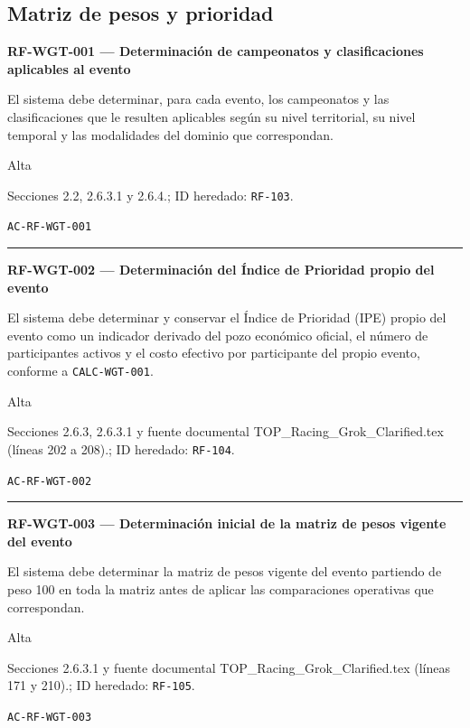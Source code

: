 \documentclass[10pt,letterpaper]{article}
\begin{document}
\subsection{Matriz de pesos y prioridad}
\noindent\textbf{RF-WGT-001 --- Determinación de campeonatos y clasificaciones aplicables al evento}\par
\begin{description}[style=nextline,leftmargin=3.15cm,labelwidth=2.8cm,font=\normalfont\bfseries]
\item[Obligación] El sistema debe determinar, para cada evento, los campeonatos y las clasificaciones que le resulten aplicables según su nivel territorial, su nivel temporal y las modalidades del dominio que correspondan.
\item[Prioridad] Alta
\item[Procedencia] Secciones 2.2, 2.6.3.1 y 2.6.4.; ID heredado: \texttt{RF-103}.
\item[Verificación] \texttt{AC-RF-WGT-001}
\end{description}
\vspace{0.25em}\hrule\vspace{0.65em}
\noindent\textbf{RF-WGT-002 --- Determinación del Índice de Prioridad propio del evento}\par
\begin{description}[style=nextline,leftmargin=3.15cm,labelwidth=2.8cm,font=\normalfont\bfseries]
\item[Obligación] El sistema debe determinar y conservar el Índice de Prioridad (IPE) propio del evento como un indicador derivado del pozo económico oficial, el número de participantes activos y el costo efectivo por participante del propio evento, conforme a \texttt{CALC-WGT-001}.
\item[Prioridad] Alta
\item[Procedencia] Secciones 2.6.3, 2.6.3.1 y fuente documental TOP\_Racing\_Grok\_Clarified.tex (líneas 202 a 208).; ID heredado: \texttt{RF-104}.
\item[Verificación] \texttt{AC-RF-WGT-002}
\end{description}
\vspace{0.25em}\hrule\vspace{0.65em}
\noindent\textbf{RF-WGT-003 --- Determinación inicial de la matriz de pesos vigente del evento}\par
\begin{description}[style=nextline,leftmargin=3.15cm,labelwidth=2.8cm,font=\normalfont\bfseries]
\item[Obligación] El sistema debe determinar la matriz de pesos vigente del evento partiendo de peso 100 en toda la matriz antes de aplicar las comparaciones operativas que correspondan.
\item[Prioridad] Alta
\item[Procedencia] Secciones 2.6.3.1 y fuente documental TOP\_Racing\_Grok\_Clarified.tex (líneas 171 y 210).; ID heredado: \texttt{RF-105}.
\item[Verificación] \texttt{AC-RF-WGT-003}
\end{description}
\end{document}
